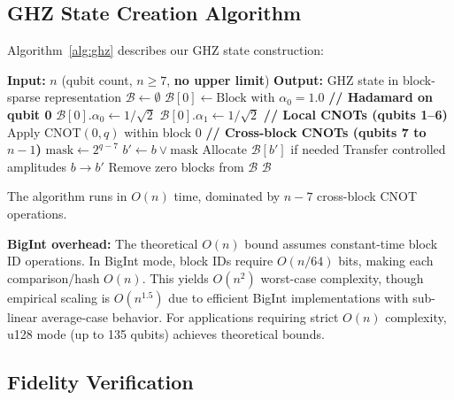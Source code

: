 \documentclass[11pt,twocolumn]{article}
\begin{document}
\subsection{GHZ State Creation Algorithm}

Algorithm~\ref{alg:ghz} describes our GHZ state construction:

\begin{algorithm}[H]
\caption{Block-Sparse GHZ State Creation}\label{alg:ghz}
\begin{algorithmic}[1]
\State \textbf{Input:} $n$ (qubit count, $n \geq 7$, \textbf{no upper limit})
\State \textbf{Output:} GHZ state in block-sparse representation
\State
\State $\mathcal{B} \gets \emptyset$ 
\State $\mathcal{B}[0] \gets \text{Block with } \alpha_0 = 1.0$
\State
\State \textbf{// Hadamard on qubit 0}
\State $\mathcal{B}[0].\alpha_0 \gets 1/\sqrt{2}$
\State $\mathcal{B}[0].\alpha_1 \gets 1/\sqrt{2}$
\State
\State \textbf{// Local CNOTs (qubits 1--6)}
    \State Apply CNOT$(0, q)$ within block 0
\EndFor
\State
\State \textbf{// Cross-block CNOTs (qubits 7 to $n-1$)}
    \State $\text{mask} \gets 2^{q-7}$
        \State $b' \gets b \lor \text{mask}$ 
        \State Allocate $\mathcal{B}[b']$ if needed
        \State Transfer controlled amplitudes $b \to b'$
    \EndFor
    \State Remove zero blocks from $\mathcal{B}$
\EndFor
\State
\State \Return $\mathcal{B}$ 
\end{algorithmic}
\end{algorithm}

The algorithm runs in $O(n)$ time, dominated by $n-7$ cross-block CNOT operations.

\textbf{BigInt overhead:} The theoretical $O(n)$ bound assumes constant-time block ID operations. In BigInt mode, block IDs require $O(n/64)$ bits, making each comparison/hash $O(n)$. This yields $O(n^2)$ worst-case complexity, though empirical scaling is $O(n^{1.5})$ due to efficient BigInt implementations with sub-linear average-case behavior. For applications requiring strict $O(n)$ complexity, u128 mode (up to 135 qubits) achieves theoretical bounds.

\subsection{Fidelity Verification}
\end{document}
